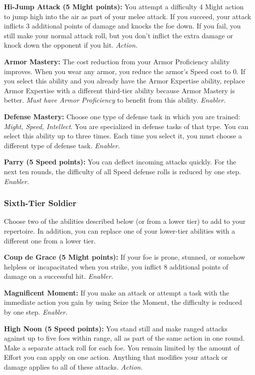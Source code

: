 \documentclass[a4paper,10pt,final,twocolumn,oneside]{book}
\newcommand{\itemAbility}[2]{\textcolor{25gray}{\textbullet\textbf{ #1:}}{ #2}\par}
\newcommand{\enabler}{\textit{ Enabler.}}
\newcommand{\action}{\textit{ Action.}}
\begin{document}
\itemAbility{Hi-Jump Attack (5 Might points)}{You attempt a difficulty 4 Might action to jump high into the air as part of your melee attack. If you succeed, your attack inflicts 3 additional points of damage and knocks the foe down. If you fail, you still make your normal attack roll, but you don’t inflict the extra damage or knock down the opponent if you hit.\action}

\itemAbility{Armor Mastery}{The cost reduction from your Armor Proficiency ability improves. When you wear any armor, you reduce the armor’s Speed cost to 0. If you select this ability and you already have the Armor Expertise ability, replace Armor Expertise with a different third-tier ability because Armor Mastery is better. \textit{Must have Armor Proficiency} to benefit from this ability.\enabler}

\itemAbility{Defense Mastery}{Choose one type of defense task in which you are trained: \textit{Might, Speed, Intellect}. You are specialized in defense tasks of that type. You can select this ability up to three times. Each time you select it, you must choose a different type of defense task.\enabler}

\itemAbility{Parry (5 Speed points)}{You can deflect incoming attacks quickly. For the next ten rounds, the difficulty of all Speed defense rolls is reduced by one step.\enabler}


\subsubsection*{Sixth-Tier Soldier}
\label{subsub:soldierSixthTier}

Choose two of the abilities described below (or from a lower tier) to add to your repertoire. In addition, you can replace one of your lower-tier abilities with a different one from a lower tier.

\itemAbility{Coup de Grace (5 Might points)}{If your foe is prone, stunned, or somehow helpless or incapacitated when you strike, you inflict 8 additional points of damage on a successful hit.\enabler}

\itemAbility{Magnificent Moment}{If you make an attack or attempt a task with the immediate action you gain by using Seize the Moment, the difficulty is reduced by one step.\enabler}

\itemAbility{High Noon (5 Speed points)}{You stand still and make ranged attacks against up to five foes within range, all as part of the same action in one round. Make a separate attack roll for each foe. You remain limited by the amount of Effort you can apply on one action. Anything that modifies your attack or damage applies to all of these attacks.\action}
\end{document}
